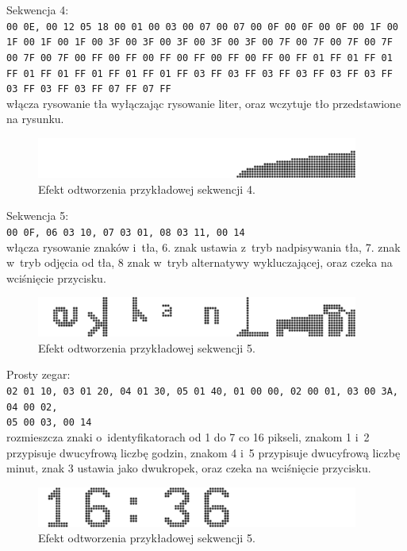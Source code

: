 Sekwencja 4:\\
{\small\texttt{00 0E, 00 12 05 18 00 01 00 03 00 07 00 07 00 0F 00 0F 00 0F 00 1F 00 1F 00 1F 00 1F 00 3F 00 3F 00 3F 00 3F 00 3F 00 7F 00 7F 00 7F 00 7F 00 7F 00 7F 00 FF 00 FF 00 FF 00 FF 00 FF 00 FF 00 FF 01 FF 01 FF 01 FF 01 FF 01 FF 01 FF 01 FF 01 FF 03 FF 03 FF 03 FF 03 FF 03 FF 03 FF 03 FF 03 FF 03 FF 07 FF 07 FF}}\\
włącza rysowanie tła wyłączając rysowanie liter, oraz wczytuje tło przedstawione na rysunku.

\begin{figure}[htb]
	\begin{center}
		\includegraphics[width=300pt]{figures/screensample3.png}
	\end{center}
	\caption{Efekt odtworzenia przykładowej sekwencji 4.}
\end{figure}

Sekwencja 5:\\
{\small\texttt{00 0F, 06 03 10, 07 03 01, 08 03 11, 00 14}}\\
włącza rysowanie znaków i~tła, 6. znak ustawia z~tryb nadpisywania tła, 7. znak w~tryb odjęcia od tła, 8 znak w~tryb alternatywy wykluczającej, oraz czeka na wciśnięcie przycisku.
\begin{figure}[htb]
	\begin{center}
		\includegraphics[width=300pt]{figures/screensample4.png}
	\end{center}
	\caption{Efekt odtworzenia przykładowej sekwencji 5.}
\end{figure}

Prosty zegar:\\
{\small\texttt{02 01 10, 03 01 20, 04 01 30, 05 01 40, 01 00 00, 02 00 01, 03 00 3A, 04 00 02,\\05 00 03, 00 14}}\\
rozmieszcza znaki o~identyfikatorach od 1 do 7 co 16 pikseli, znakom 1 i~2 przypisuje dwucyfrową liczbę godzin, znakom 4 i~5 przypisuje dwucyfrową liczbę minut, znak 3 ustawia jako dwukropek, oraz czeka na wciśnięcie przycisku.

\begin{figure}[htb]
	\begin{center}
		\includegraphics[width=300pt]{figures/screensample5.png}
	\end{center}
	\caption{Efekt odtworzenia przykładowej sekwencji 5.}
\end{figure}

